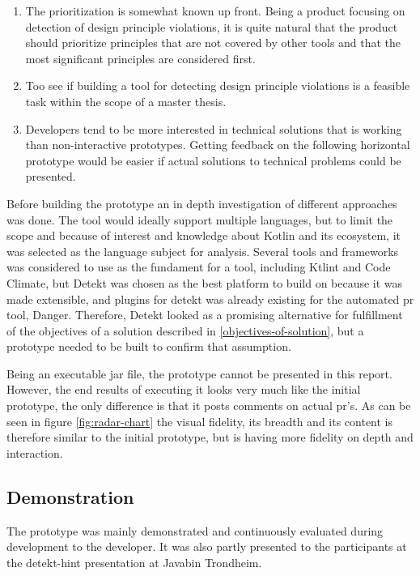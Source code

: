 \documentclass{report}
\begin{document}
\begin{enumerate}
    \item The prioritization is somewhat known up front. Being a product focusing on detection of design principle violations, it is quite natural that the product should prioritize principles that are not covered by other tools and that the most significant principles are considered first.
    \item Too see if building a tool for detecting design principle violations is a feasible task within the scope of a master thesis.
    \item Developers tend to be more interested in technical solutions that is working than non-interactive prototypes. Getting feedback on the following horizontal prototype would be easier if actual solutions to technical problems could be presented.
\end{enumerate}

Before building the prototype an in depth investigation of different approaches was done. The tool would ideally support multiple languages, but to limit the scope and because of interest and knowledge about Kotlin and its ecosystem, it was selected as the language subject for analysis. Several tools and frameworks was considered to use as the fundament for a tool, including Ktlint\cite{ktlint} and Code Climate\cite{codeclimate}, but Detekt\cite{detekt} was chosen as the best platform to build on because it was made extensible, and plugins for detekt was already existing for the automated \gls{pr} tool\cite{danger-detekt-plugin}, Danger\cite{danger}. Therefore, Detekt looked as a promising alternative for fulfillment of the objectives of a solution described in \ref{objectives-of-solution}, but a prototype needed to be built to confirm that assumption. 

Being an executable jar file, the prototype cannot be presented in this report. However, the end results of executing it looks very much like the initial prototype, the only difference is that it posts comments on actual \gls{pr}'s. As can be seen in figure \ref{fig:radar-chart} the visual fidelity, its breadth and its content is therefore similar to the initial prototype, but is having more fidelity on depth and interaction.  

\subsection*{Demonstration}
The prototype was mainly demonstrated and continuously evaluated during development to the developer. It was also partly presented to the participants at the detekt-hint presentation at Javabin Trondheim.
\end{document}
